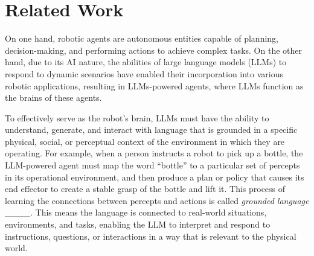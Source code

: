 \section{Related Work}
\label{sec:RelWork}
On one hand, robotic agents are autonomous entities capable of planning, decision-making, and performing actions to achieve complex tasks. On the other hand, due to its AI nature, the abilities of large language models (LLMs) to respond to dynamic scenarios have enabled their incorporation into various robotic applications, resulting in LLMs-powered agents, where LLMs function as the brains of these agents. 

To effectively serve as the robot's brain, LLMs must have the ability to understand, generate, and interact with language that is grounded in a specific physical, social, or perceptual context of the environment in which they are operating. For example, when a person instructs a
robot to pick up a bottle, the LLM-powered agent must map the word ``bottle” to a particular set of percepts in its operational environment, and then produce a plan or policy that causes its end effector to create a stable grasp of the bottle and lift it. This process of learning the connections between percepts and actions is called \textit{grounded language} ____. This means the language is connected to real-world situations, environments, and tasks, enabling the LLM to interpret and respond to instructions, questions, or interactions in a way that is relevant to the physical world.









